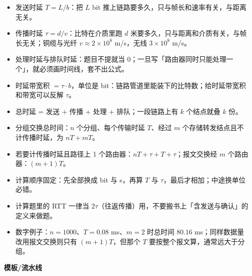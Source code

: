 \documentclass[10pt,a4paper]{ctexart}
\begin{document}
\begin{itemize}

\item 发送时延 $T = L/b$：把 $L$ bit 推上链路要多久，只与帧长和速率有关，与距离无关。

\item 传播时延 $\tau = d/v$：比特在介质里跑 $d$ 米要多久，只与距离和介质有关，与帧长无关；铜缆与光纤 $v \approx 2\times10^{8}$ m/s，无线 $3\times10^{8}$ m/s。

\item 处理时延与排队时延：题目不提就当 0；一旦写「路由器同时只能处理一个」，就必须画时间线，套不出公式。

\item 时延带宽积 $= \tau \cdot b$，单位是 bit：链路管道里能装下的比特数；给时延带宽积和带宽可以反解 $\tau$。

\item 总时延 = 发送 + 传播 + 处理 + 排队；一段链路上有 $k$ 个结点就叠 $k$ 份。

\item 分组交换总时间：$n$ 个分组、每个传输时延 $T$、经过 $m$ 个存储转发结点且不计传播时延，为 $nT + mT$。

\item 若要计传播时延且路径上 1 个路由器：$nT + \tau + T + \tau$；报文交换经 $m$ 个路由器：$(m+1)T$。

\item 计算顺序固定：先全部换成 bit 与 s，再算 $T$ 与 $\tau$，最后才相加；中途换单位必错。

\item 计算题里的 RTT 一律当 $2\tau$（往返传播）用，不要搬书上「含发送与确认」的定义来做题。

\item 数字例子：$n = 1000$、$T = 0.08$ ms、$m = 2$ 时总时间 $80.16$ ms；同样数据量改用报文交换则只有 $(m+1)T$，但那个 $T$ 要按整个报文算，通常远大于分组。

\end{itemize}


\textbf{模板/流水线}
\end{document}
